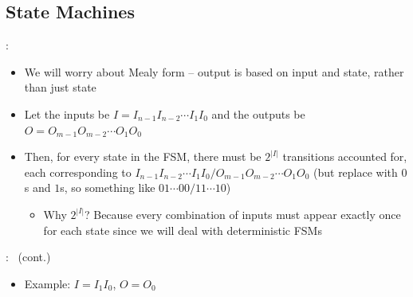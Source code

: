\documentclass{../slides}
\begin{document}
\subsection{State Machines}
\begin{frame}{\secname: \subsecname}
    \begin{itemize}
        \item We will worry about Mealy form -- output is based on input and state, rather than just state
        \item Let the inputs be $I = I_{n-1}I_{n-2}\cdots I_1I_0$ and the outputs be $O = O_{m-1}O_{m-2}\cdots O_1O_0$
        \item Then, for every state in the FSM, there must be $2^{|I|}$ transitions accounted for, each corresponding to $I_{n-1}I_{n-2}\cdots I_1I_0 / O_{m-1}O_{m-2}\cdots O_1O_0$ (but replace with $0$s and $1$s, so something like $01\cdots 00 / 11\cdots 10$)
        \begin{itemize}
            \item Why $2^{|I|}$? Because every combination of inputs must appear exactly once for each state since we will deal with deterministic FSMs
        \end{itemize}
    \end{itemize}
\end{frame}

\begin{frame}{\secname: \subsecname\ (cont.)}
    \begin{itemize}
        \item Example: $I = I_1I_0$, $O = O_0$
        \begin{figure}[H]
            \centering
        \end{figure}
    \end{itemize}
\end{frame}
\end{document}
